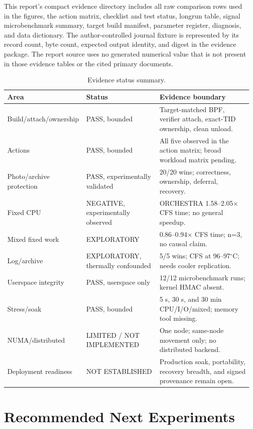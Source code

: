 \documentclass[10pt,letterpaper,twocolumn]{article}
\begin{document}
This report's compact evidence directory includes all raw comparison rows used in the figures, the action matrix, checklist and test status, longrun table, signal microbenchmark summary, target build manifest, parameter register, diagnosis, and data dictionary. The author-controlled journal fixture is represented by its record count, byte count, expected output identity, and digest in the evidence package. The report source uses no generated numerical value that is not present in those evidence tables or the cited primary documents.

\begin{table}[t]
\centering\scriptsize
\caption{Evidence status summary.}
\label{tab:status}
\begin{tabularx}{\columnwidth}{p{}p{}Y}
\toprule
Area & Status & Evidence boundary \\
\midrule
Build/attach/ownership & PASS, bounded & Target-matched BPF, verifier attach, exact-TID ownership, clean unload. \\
Actions & PASS, bounded & All five observed in the action matrix; broad workload matrix pending. \\
Photo/archive protection & PASS, experimentally validated & 20/20 wins; correctness, ownership, deferral, recovery. \\
Fixed CPU & NEGATIVE, experimentally observed & ORCHESTRA 1.58--2.05$\times$ CFS time; no general speedup. \\
Mixed fixed work & EXPLORATORY & 0.86--0.94$\times$ CFS time; n=3, no causal claim. \\
Log/archive & EXPLORATORY, thermally confounded & 5/5 wins; CFS at 96--97$^\circ$C; needs cooler replication. \\
Userspace integrity & PASS, userspace only & 12/12 microbenchmark runs; kernel HMAC absent. \\
Stress/soak & PASS, bounded & 5 s, 30 s, and 30 min CPU/I/O/mixed; memory tool missing. \\
NUMA/distributed & LIMITED / NOT IMPLEMENTED & One node; same-node movement only; no distributed backend. \\
Deployment readiness & NOT ESTABLISHED & Production soak, portability, recovery breadth, and signed provenance remain open. \\
\bottomrule
\end{tabularx}
\end{table}

\section{Recommended Next Experiments}
\end{document}
